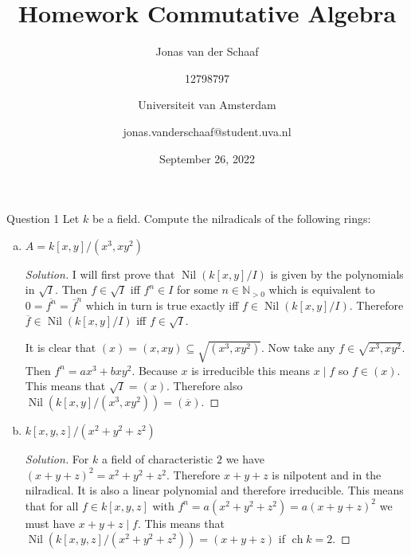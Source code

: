 \documentclass{article}
\title{Homework Commutative Algebra}
\author{Jonas van der Schaaf \and 12798797 \and Universiteit van Amsterdam \and jonas.vanderschaaf@student.uva.nl}
\date{September 26, 2022}
\newcommand{\N}{\mathbb{N}}
\DeclareMathOperator{\Nil}{Nil}
\DeclareMathOperator{\ch}{ch}
\newenvironment{question}[1][]{\begin{paragraph}{Question #1}}{\end{paragraph}}
\newenvironment{solution}{\begin{proof}[Solution]\renewcommand\qedsymbol{}}{\end{proof}}
\theoremstyle{definition}
\begin{document}
\maketitle

\begin{question}[1]
    Let \(k\) be a field. Compute the nilradicals of the following rings:
    \begin{enumerate}[(a)]
        \item \(A=k[x,y]/(x^{3}, xy^{2})\)

              \begin{solution}
                  I will first prove that \(\Nil(k[x,y]/I)\) is given by the
                  polynomials in \(\sqrt{I}\). Then \(f\in\sqrt{I}\) iff
                  \(f^{n}\in I\) for some \(n\in\N_{>0}\) which is equivalent to
                  \(0=\overline{f^{n}}=\overline{f}^{n}\) which in turn is true
                  exactly iff \(f\in\Nil(k[x,y]/I)\). Therefore
                  \(\overline{f}\in\Nil(k[x,y]/I)\) iff \(f\in\sqrt{I}\).


                  It is clear that \((x)=(x,xy)\subseteq\sqrt{(x^{3},xy^{2})}\).
                  Now take any \(f\in\sqrt{x^{3},xy^{2}}\). Then
                  \(f^{n}=ax^{3}+bxy^{2}\). Because \(x\) is irreducible this
                  means \(x\mid f\) so \(f\in(x)\). This means that
                  \(\sqrt{I}=(x)\). Therefore also
                  \(\Nil(k[x,y]/(x^{3},xy^{2}))=(\overline{x})\).
              \end{solution}

        \item \(k[x,y,z]/(x^{2}+y^{2}+z^{2})\)

              \begin{solution}
                  For \(k\) a field of characteristic \(2\) we have
                  \((x+y+z)^{2}=x^{2}+y^{2}+z^{2}\). Therefore \(x+y+z\) is
                  nilpotent and in the nilradical. It is also a linear
                  polynomial and therefore irreducible. This means that for all
                  \(f\in k[x,y,z]\) with
                  \(f^{n}=a(x^{2}+y^{2}+z^{2})=a(x+y+z)^{2}\) we must have
                  \(x+y+z\mid f\). This means that
                  \(\Nil(k[x,y,z]/(x^{2}+y^{2}+z^{2}))=(x+y+z)\) if \(\ch k=2\).


\end{solution}
\end{enumerate}
\end{question}
\end{document}
